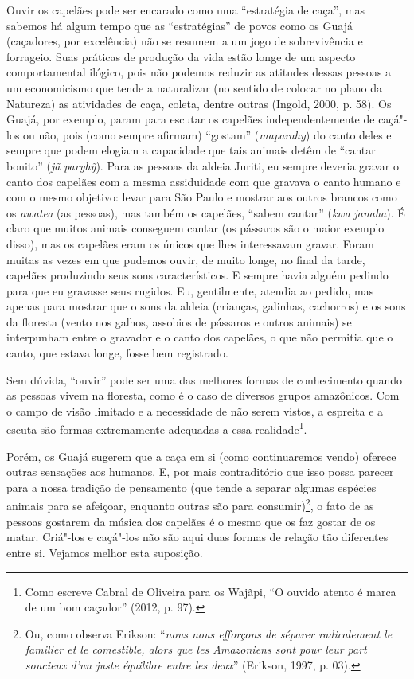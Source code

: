 Ouvir os capelães pode ser encarado como uma ``estratégia de caça'', mas
sabemos há algum tempo que as ``estratégias'' de povos como os Guajá
(caçadores, por excelência) não se resumem a um jogo de sobrevivência e
forrageio. Suas práticas de produção da vida estão longe de um aspecto
comportamental ilógico, pois não podemos reduzir as atitudes dessas
pessoas a um economicismo que tende a naturalizar (no sentido de colocar
no plano da Natureza) as atividades de caça, coleta, dentre outras
(Ingold, 2000, p. 58). Os Guajá, por exemplo, param para escutar os
capelães independentemente de caçá"-los ou não, pois (como sempre
afirmam) ``gostam'' (\emph{maparahy}) do canto deles e sempre que podem
elogiam a capacidade que tais animais detêm de ``cantar bonito''
(\emph{jã} \emph{paryhỹ}). Para as pessoas da aldeia Juriti, eu sempre
deveria gravar o canto dos capelães com a mesma assiduidade com que
gravava o canto humano e com o mesmo objetivo: levar para São Paulo e
mostrar aos outros brancos como os \emph{awatea} (as pessoas), mas
também os capelães, ``sabem cantar'' (\emph{kwa} \emph{janaha}). É claro
que muitos animais conseguem cantar (os pássaros são o maior exemplo
disso), mas os capelães eram os únicos que lhes interessavam gravar.
Foram muitas as vezes em que pudemos ouvir, de muito longe, no final da
tarde, capelães produzindo seus sons característicos. E sempre havia
alguém pedindo para que eu gravasse seus rugidos. Eu, gentilmente,
atendia ao pedido, mas apenas para mostrar que o sons da aldeia
(crianças, galinhas, cachorros) e os sons da floresta (vento nos galhos,
assobios de pássaros e outros animais) se interpunham entre o gravador e
o canto dos capelães, o que não permitia que o canto, que estava longe,
fosse bem registrado.

Sem dúvida, ``ouvir'' pode ser uma das melhores formas de conhecimento
quando as pessoas vivem na floresta, como é o caso de diversos grupos
amazônicos. Com o campo de visão limitado e a necessidade de não serem
vistos, a espreita e a escuta são formas extremamente adequadas a essa
realidade\footnote{Como escreve Cabral de Oliveira para os Wajãpi, ``O
  ouvido atento é marca de um bom caçador'' (2012, p. 97).}.

Porém, os Guajá sugerem que a caça em si (como continuaremos vendo)
oferece outras sensações aos humanos. E, por mais contraditório que isso
possa parecer para a nossa tradição de pensamento (que tende a separar
algumas espécies animais para se afeiçoar, enquanto outras são para
consumir)\footnote{Ou, como observa Erikson: ``\emph{nous nous efforçons
  de séparer radicalement le familier et le comestible, alors que les
  Amazoniens sont pour leur part soucieux d'un juste équilibre entre les
  deux}'' (Erikson, 1997, p. 03).}, o fato de as pessoas gostarem da música
dos capelães é o mesmo que os faz gostar de os matar. Criá"-los e
caçá"-los não são aqui duas formas de relação tão diferentes entre si.
Vejamos melhor esta suposição.

